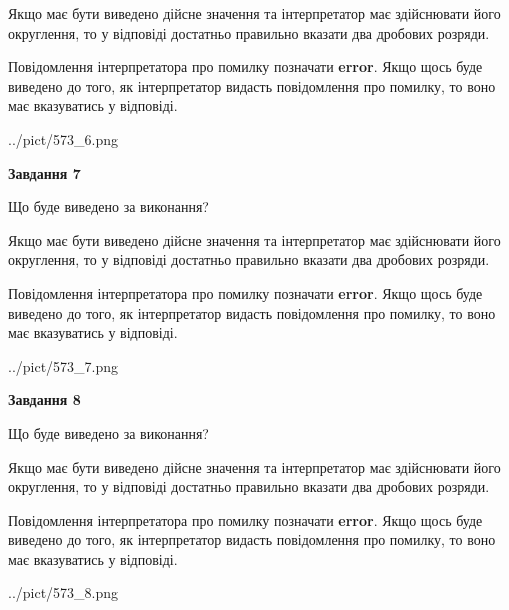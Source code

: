 \documentclass[12pt, ukrainian]{article}
\begin{document}
{\begin {Large}
Якщо має бути виведено дійсне значення та інтерпретатор має здійснювати його округлення, 
то у відповіді достатньо правильно вказати два дробових розряди.

Повідомлення інтерпретатора про помилку позначати \textbf{error}.
Якщо щось буде виведено до того, як інтерпретатор видасть повідомлення про помилку, 
то воно має вказуватись у відповіді. \par

\begin{center}
	{../pict/573_6.png}
\end{center}
\newpage

{\begin {center}\textbf{Завдання 7}\end {center}}\par
Що буде виведено за виконання? \par

Якщо має бути виведено дійсне значення та інтерпретатор має здійснювати його округлення, 
то у відповіді достатньо правильно вказати два дробових розряди.

Повідомлення інтерпретатора про помилку позначати \textbf{error}.
Якщо щось буде виведено до того, як інтерпретатор видасть повідомлення про помилку, 
то воно має вказуватись у відповіді. \par

\begin{center}
	{../pict/573_7.png}
\end{center}
\newpage

{\begin {center}\textbf{Завдання 8}\end {center}}\par
Що буде виведено за виконання? \par

Якщо має бути виведено дійсне значення та інтерпретатор має здійснювати його округлення, 
то у відповіді достатньо правильно вказати два дробових розряди.

Повідомлення інтерпретатора про помилку позначати \textbf{error}.
Якщо щось буде виведено до того, як інтерпретатор видасть повідомлення про помилку, 
то воно має вказуватись у відповіді. \par

\begin{center}
	{../pict/573_8.png}
\end{center}
\newpage


\end{Large}}
\end{document}

